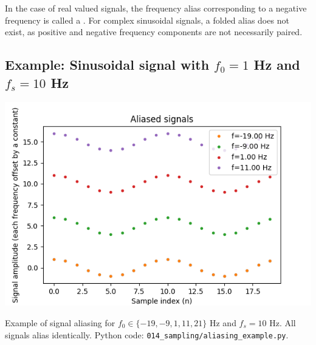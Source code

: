 In the case of real valued signals, the frequency alias corresponding to a negative frequency is called a \emph{}. For complex sinusoidal signals, a folded alias does not exist, as positive and negative frequency components are not necessarily paired.

\subsection{Example: Sinusoidal signal with $f_0=1$ Hz and $f_s=10$ Hz}
\begin{marginfigure}
  \begin{center}
    \includegraphics[width=\textwidth]{ch09/figures/aliased_signals.png}
  \end{center}
  \caption{Example of signal aliasing for $f_0\in \{-19,-9,1,11,21\}$
    Hz and $f_s=10$ Hz. All signals alias identically. Python code:
    \texttt{014\_sampling/aliasing\_example.py}.}
\end{marginfigure}


